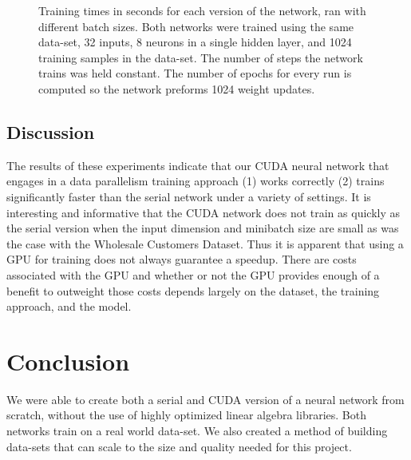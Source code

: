 \documentclass[11pt,a4paper]{article}
\begin{document}
\begin{figure}
\flushleft
{}\caption{Training times in seconds for each version of the network, ran with different batch sizes. Both networks were trained using the same data-set, 32 inputs, 8 neurons in a single hidden layer, and 1024 training samples in the data-set. The number of steps the network trains was held constant. The number of epochs for every run is computed so the network preforms 1024 weight updates. }\label{fig:batch_sz_scaling}
\end{figure}

\subsection{Discussion}
The results of these experiments indicate that our CUDA neural network that engages in a data parallelism training approach (1) works correctly (2) trains significantly faster than the serial network under a variety of settings. It is interesting and informative that the CUDA network does not train as quickly as the serial version when the input dimension and minibatch size are small as was the case with the Wholesale Customers Dataset. Thus it is apparent that using a GPU for training does not always guarantee a speedup. There are costs associated with the GPU and whether or not the GPU provides enough of a benefit to outweight those costs depends largely on the dataset, the training approach, and the model.

\section{Conclusion} \label{conclusion}
We were able to create both a serial and CUDA version of a neural network from scratch, without the use of highly optimized linear algebra libraries. Both networks train on a real world data-set. We also created a method of building data-sets that can scale to the size and quality needed for this project.
\end{document}

